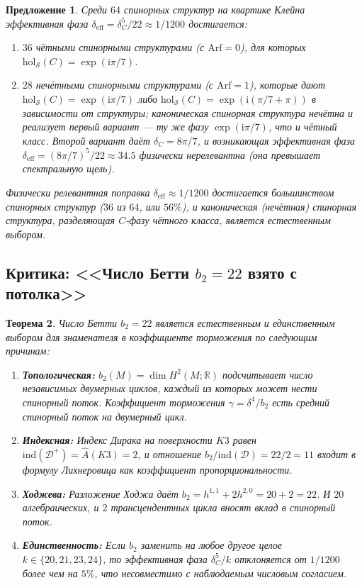 \documentclass[12pt,a4paper]{article}
\newtheorem{theorem}{Теорема}[section]
\newtheorem{proposition}[theorem]{Предложение}
\theoremstyle{definition}
\theoremstyle{remark}
\newcommand{\RR}{\mathbb{R}}
\newcommand{\hol}{\mathrm{hol}}
\newcommand{\ind}{\mathrm{ind}}
\newcommand{\cD}{\mathcal{D}}
\newcommand{\cS}{\mathcal{S}}
\newcommand{\ii}{\mathrm{i}}
\begin{document}
\begin{proposition}
Среди $64$ спинорных структур на квартике Клейна эффективная фаза $\delta_{\mathrm{eff}} = \delta_C^5/22 \approx 1/1200$ достигается:
\begin{enumerate}[label=(\roman*)]
\item $36$ чётными спинорными структурами (с $\mathrm{Arf} = 0$), для которых $\hol_{\cS}(C) = \exp(\ii\pi/7)$.
\item $28$ нечётными спинорными структурами (с $\mathrm{Arf} = 1$), которые дают $\hol_{\cS}(C) = \exp(\ii\pi/7)$ либо $\hol_{\cS}(C) = \exp(\ii(\pi/7 + \pi))$ в зависимости от структуры; каноническая спинорная структура нечётна и реализует первый вариант --- ту же фазу $\exp(\ii\pi/7)$, что и чётный класс. Второй вариант даёт $\delta_C = 8\pi/7$, и возникающая эффективная фаза $\delta_{\mathrm{eff}} = (8\pi/7)^5/22 \approx 34.5$ физически нерелевантна (она превышает спектральную щель).
\end{enumerate}
Физически релевантная поправка $\delta_{\mathrm{eff}} \approx 1/1200$ достигается большинством спинорных структур ($36$ из $64$, или $56\%$), и каноническая (нечётная) спинорная структура, разделяющая $C$-фазу чётного класса, является естественным выбором.
\end{proposition}

\subsection{Критика: <<Число Бетти $b_2 = 22$ взято с потолка>>}

\begin{theorem}
\label{thm:b2-natural-ru}
Число Бетти $b_2 = 22$ является естественным и единственным выбором для знаменателя в коэффициенте торможения по следующим причинам:
\begin{enumerate}[label=(\roman*)]
\item \textbf{Топологическая:} $b_2(M) = \dim H^2(M; \RR)$ подсчитывает число независимых двумерных циклов, каждый из которых может нести спинорный поток. Коэффициент торможения $\gamma = \delta^4/b_2$ есть средний спинорный поток на двумерный цикл.
\item \textbf{Индексная:} Индекс Дирака на поверхности $K3$ равен $\ind(\cD^+) = \hat{A}(K3) = 2$, и отношение $b_2/\ind(\cD) = 22/2 = 11$ входит в формулу Лихнеровица как коэффициент пропорциональности.
\item \textbf{Ходжева:} Разложение Ходжа даёт $b_2 = h^{1,1} + 2h^{2,0} = 20 + 2 = 22$. И $20$ алгебраических, и $2$ трансцендентных цикла вносят вклад в спинорный поток.
\item \textbf{Единственность:} Если $b_2$ заменить на любое другое целое $k \in \{20, 21, 23, 24\}$, то эффективная фаза $\delta_C^5/k$ отклоняется от $1/1200$ более чем на $5\%$, что несовместимо с наблюдаемым числовым согласием.
\end{enumerate}
\end{theorem}
\end{document}
